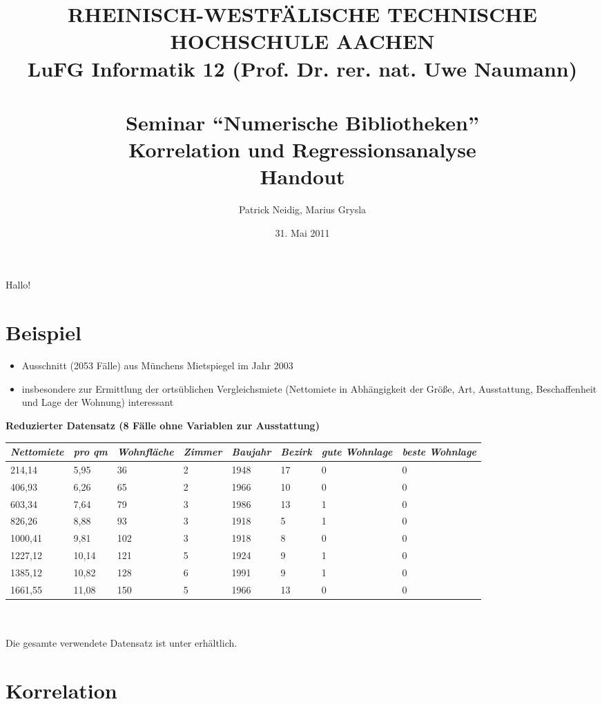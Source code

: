 \documentclass[a4paper]{article}
\title{
{\bf \scriptsize RHEINISCH-WESTF\"ALISCHE TECHNISCHE HOCHSCHULE AACHEN \\
LuFG Informatik 12 (Prof. Dr. rer. nat. Uwe Naumann)}\\
~\\
Seminar ``Numerische Bibliotheken''\\
{\bf \Large Korrelation und Regressionsanalyse} \\
{\large Handout} 
}
\author{Patrick Neidig, Marius Grysla}
\date{31. Mai 2011}
\begin{document}
\maketitle

Hallo!\cite{Cramer2007}\cite{Golub1989}

\section*{Beispiel}
\begin{itemize}
	\item Ausschnitt (2053 Fälle) aus Münchens Mietspiegel im Jahr 2003
	\item insbesondere zur Ermittlung der ortsüblichen Vergleichsmiete (Nettomiete in Abhängigkeit der Größe, Art, Ausstattung, Beschaffenheit und Lage der Wohnung) interessant
\end{itemize}

\par \textbf{Reduzierter Datensatz (8 Fälle ohne Variablen zur Ausstattung)}\\
	
	\begin{tabular}[ht]{|l|l|l|l|l|l|l|l|}
  	\hline
  	\textit{Nettomiete} & \textit{pro qm} & \textit{Wohnfläche} & \textit{Zimmer} & \textit{Baujahr} & \textit{Bezirk} & \textit{gute Wohnlage} & \textit{beste Wohnlage}\\
  	\hline \hline
  	214,14 & 5,95 & 36 & 2 & 1948 & 17 & 0 & 0\\ \hline
  	406,93 & 6,26 & 65 & 2 & 1966 & 10 & 0 & 0\\ \hline
		603,34 & 7,64 & 79 & 3 & 1986 & 13 & 1 & 0\\ \hline
		826,26 & 8,88 & 93 & 3 & 1918 & 5 & 1 &0\\ \hline
		1000,41 & 9,81 & 102 & 3 & 1918 & 8 & 0 & 0\\ \hline
		1227,12 & 10,14 & 121 & 5 & 1924 & 9 & 1 & 0\\ \hline
		1385,12 & 10,82 & 128 & 6 & 1991 & 9 & 1 & 0\\ \hline
		1661,55 & 11,08 & 150 & 5 & 1966 & 13 & 0 & 0\\
  	\hline
	\end{tabular} \\\\

Die gesamte verwendete Datensatz ist unter \cite{Fahrmeier2011} erhältlich.

\section*{Korrelation}
\end{document}
